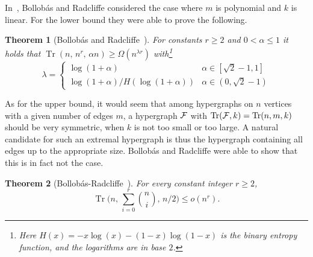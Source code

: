 \documentclass[11pt]{article}
\newtheorem{theo}{Theorem}[section]
\newtheorem{theo}{Theorem}[section]
\newcommand{\FF}{{\cal F}}
\renewcommand{\a}{\alpha}
\DeclareMathOperator{\trace}{Tr}
\begin{document}

In~\cite{BR}, Bollob\'as and Radcliffe considered the case where $m$ is polynomial and $k$ is linear. For the lower bound they were able to prove the following.
\begin{theo} [Bollob\'as and Radcliffe{~\cite[Theorem 7]{BR}}]
	\label{th:brlb}
	For constants $r\ge 2$ and $0 < \a \le 1$ it holds that $\trace(n,\,n^r,\,\a n) \ge \Omega(n^{\lambda r})$
	with\footnote{Here $H(x) = -x\log(x) - (1-x)\log(1-x)$ is the binary entropy function, and the logarithms are in base $2$.}
	$$\lambda =
	\begin{cases}
	\log(1+\alpha) & \alpha \in [\sqrt 2 -1, 1]\\
	\log(1+\alpha)/H(\log(1+\alpha)) & \alpha \in (0, \sqrt 2 -1)
	\end{cases}$$
\end{theo}

As for the upper bound, it would seem that among hypergraphs on $n$ vertices with a given number of edges $m$, a hypergraph $\FF$ with $\trace(\FF,k) = \trace(n,m,k)$ should be very symmetric, when $k$ is not too small or too large. A natural candidate for such an extremal hypergraph is thus the hypergraph containing all edges up to the appropriate size.
Bollob\'as and Radcliffe were able 
to show that this is in fact not the case. 
\begin {theo} [Bollob\'as-Radcliffe{~\cite[Theorem 11]{BR}}]
\label{th:brup}
For every constant integer $r \ge 2$, 
$$\trace\bigg(n,\, \sum_{i=0}^r \binom n i,\, n/2\bigg) \le o(n^r) .$$
\end {theo}

\end{document}

